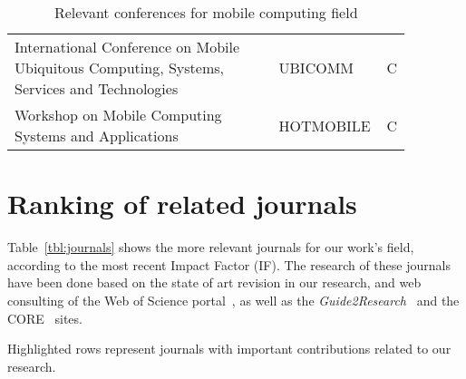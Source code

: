\documentclass{scrartcl}
\begin{document}
\begin{table}[t]
\begin{tabular}{C{0.65\linewidth}C{0.17\linewidth}C{0.05\linewidth}}
International Conference on Mobile Ubiquitous Computing, Systems, Services and Technologies            & UBICOMM                              & C                                 \\
\cmidrule(l){1-3}



Workshop on Mobile Computing Systems and Applications                                                  & HOTMOBILE                            & C                                 \\ \bottomrule
\end{tabular}
\caption{Relevant conferences for mobile computing field}
\label{tbl:conferences}
\end{table}


\section{Ranking of related journals}
Table~\ref{tbl:journals} shows the more relevant journals for our work's field, according to the most recent Impact Factor (IF).
The research of these journals have been done based on the state of art revision in our research, and web consulting of the Web of Science portal~\cite{Reuters2015}, as well as the \emph{Guide2Research}~\cite{Guide2015} and the CORE~\cite{Core2015} sites.

Highlighted rows represent journals with important contributions related to our research.
\end{document}
